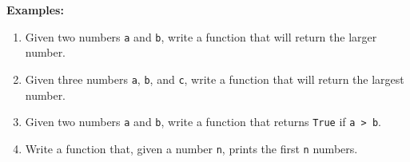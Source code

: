 \documentclass[11pt]{article}
\begin{document}
\textbf{Examples:}

\begin{enumerate}
\def\labelenumi{\arabic{enumi}.}
\item
  Given two numbers \texttt{a} and \texttt{b}, write a function that
  will return the larger number.
\item
  Given three numbers \texttt{a}, \texttt{b}, and \texttt{c}, write a
  function that will return the largest number.
\item
  Given two numbers \texttt{a} and \texttt{b}, write a function that
  returns \texttt{True} if \texttt{a\ \textgreater{}\ b}.
\item
  Write a function that, given a number \texttt{n}, prints the first
  \texttt{n} numbers.
\end{enumerate}
\end{document}
